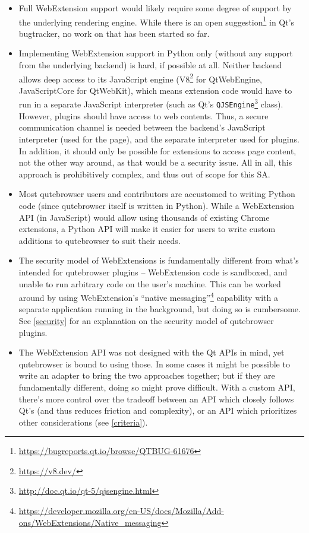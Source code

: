 \documentclass[a4paper,parskip=full]{scrreprt}
\begin{document}
\begin{itemize}
  \item Full WebExtension support would likely require some degree of support by
    the underlying rendering engine. While there is an open
    suggestion\footnote{\url{https://bugreports.qt.io/browse/QTBUG-61676}} in
    Qt's bugtracker, no work on that has been started so far.
  \item Implementing WebExtension support in Python only (without any support
    from the underlying backend) is hard, if possible at all. Neither
    backend allows deep access to its JavaScript engine
    (V8\footnote{\url{https://v8.dev/}} for QtWebEngine, JavaScriptCore for
    QtWebKit), which means extension code would have to run in a separate
    JavaScript interpreter (such as Qt's
    \verb|QJSEngine|\footnote{\url{http://doc.qt.io/qt-5/qjsengine.html}} class).
    However, plugins should have access to web contents. Thus, a secure
    communication channel is needed between the backend's JavaScript interpreter
    (used for the page), and the separate interpreter used for plugins. In
    addition, it should only be possible for extensions to access page content,
    not the other way around, as that would be a security issue. All in all,
    this approach is prohibitively complex, and thus out of scope for this SA.
  \item Most qutebrowser users and contributors are accustomed to writing Python
    code (since qutebrowser itself is written in Python). While a WebExtension
    API (in JavaScript) would allow using thousands of existing Chrome extensions, a
    Python API will make it easier for users to write custom additions to
    qutebrowser to suit their needs.
  \item The security model of WebExtensions is fundamentally different from
    what's intended for qutebrowser plugins -- WebExtension code is sandboxed,
    and unable to run arbitrary code on the user's machine. This can be worked
around by using WebExtension's ``native
    messaging''\footnote{\url{https://developer.mozilla.org/en-US/docs/Mozilla/Add-ons/WebExtensions/Native_messaging}}
    capability with a separate application running in the background, but doing
    so is cumbersome. See \ref{security} for an explanation on the security
    model of qutebrowser plugins.
  \item The WebExtension API was not designed with the Qt APIs in mind, yet
    qutebrowser is bound to using those. In some cases it might be possible to
    write an adapter to bring the two approaches together; but if they are
    fundamentally different, doing so might prove difficult. With a custom API,
    there's more control over the tradeoff between an API which closely follows
    Qt's (and thus reduces friction and complexity), or an API which prioritizes
    other considerations (see \ref{criteria}).
\end{itemize}
\end{document}
